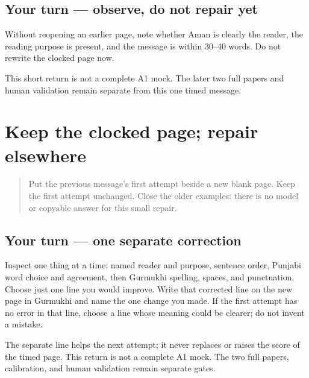\subsection*{Your turn — observe, do not repair yet}
Without reopening an earlier page, note whether Aman is clearly the reader, the reading purpose is present, and the message is within 30–40 words. Do not rewrite the clocked page now.

\begin{tcolorbox}[breakable,colback=teal!4,colframe=teal!35!black,title={Before you move on}]
This short return is not a complete A1 mock. The later two full papers and human validation remain separate from this one timed message.
\end{tcolorbox}
\section[(one separate repair after the clock)]{Keep the clocked page; repair elsewhere}

\label{lesson:PA-R173-timed-repair-again}



\begin{quote}
Put the previous message's first attempt beside a new blank page. Keep the first attempt unchanged. Close the older examples: there is no model or copyable answer for this small repair.
\end{quote}

\subsection*{Your turn — one separate correction}
Inspect one thing at a time: named reader and purpose, sentence order, Punjabi word choice and agreement, then Gurmukhi spelling, spaces, and punctuation. Choose just one line you would improve. Write that corrected line on the new page in Gurmukhi and name the one change you made. If the first attempt has no error in that line, choose a line whose meaning could be clearer; do not invent a mistake.

\begin{tcolorbox}[breakable,colback=teal!4,colframe=teal!35!black,title={Before you move on}]
The separate line helps the next attempt; it never replaces or raises the score of the timed page. This return is not a complete A1 mock. The two full papers, calibration, and human validation remain separate gates.
\end{tcolorbox}
